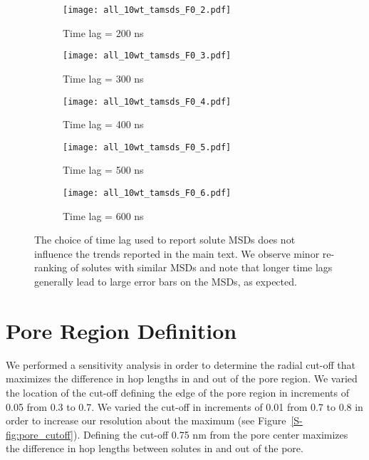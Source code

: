   \begin{figure}[!htb]
  \centering
  \begin{subfigure}{0.325\textwidth}
  \texttt{[image: all\_10wt\_tamsds\_F0\_2.pdf]}
  \caption{Time lag = 200 ns}\label{S-fig:F0.2}
  \end{subfigure}
  \begin{subfigure}{0.325\textwidth}
  \texttt{[image: all\_10wt\_tamsds\_F0\_3.pdf]}
  \caption{Time lag = 300 ns}\label{S-fig:F0.3}
  \end{subfigure}
  \begin{subfigure}{0.325\textwidth}
  \texttt{[image: all\_10wt\_tamsds\_F0\_4.pdf]}
  \caption{Time lag = 400 ns}\label{S-fig:F0.4}
  \end{subfigure}
  \begin{subfigure}{0.325\textwidth}
  \texttt{[image: all\_10wt\_tamsds\_F0\_5.pdf]}
  \caption{Time lag = 500 ns}\label{S-fig:F0.5}
  \end{subfigure}
  \begin{subfigure}{0.325\textwidth}
  \texttt{[image: all\_10wt\_tamsds\_F0\_6.pdf]}
  \caption{Time lag = 600 ns}\label{S-fig:F0.6}
  \end{subfigure}
  \caption{The choice of time lag used to report solute MSDs does not 
  influence the trends reported in the main text. We observe minor re-ranking
  of solutes with similar MSDs and note that longer time lags generally
  lead to large error bars on the MSDs, as expected. }\label{S-fig:lag_sensitivity}
  \end{figure}
  
  \clearpage
  
  \section{Pore Region Definition}\label{S-section:pore-region}
  
  We performed a sensitivity analysis in order to determine the radial 
  cut-off that maximizes the difference in hop lengths in and out of 
  the pore region. We varied the location of the cut-off defining the
  edge of the pore region in increments of 0.05 from 0.3 to 0.7. We
  varied the cut-off in increments of 0.01 from 0.7 to 0.8 in order to
  increase our resolution about the maximum (see Figure~\ref{S-fig:pore_cutoff}). 
  Defining the cut-off 0.75 nm from the pore center maximizes the 
  difference in hop lengths between solutes in and out of the pore.
  
